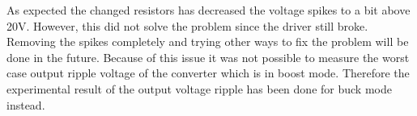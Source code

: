As expected the changed resistors has decreased the voltage spikes to a bit above 20V. However, this did not solve the problem since the driver still broke. Removing the spikes completely and trying other ways to fix the problem will be done in the future.    
Because of this issue it was not possible to measure the worst case output ripple voltage of the converter which is in boost mode. Therefore the experimental result of the output voltage ripple has been done for buck mode instead.   